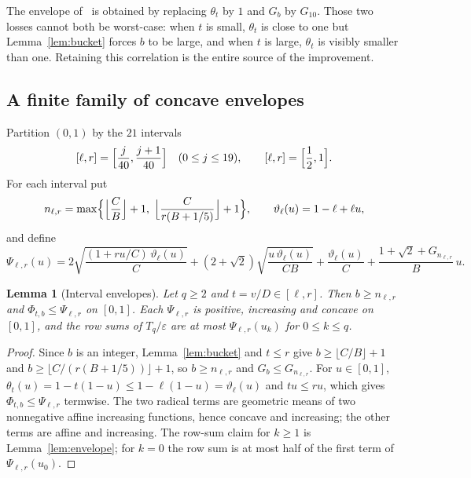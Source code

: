 \documentclass[11pt,a4paper]{article}
\newtheorem{lemma}[theorem]{Lemma}
\theoremstyle{definition}
\theoremstyle{remark}
\newcommand{\eps}{\varepsilon}
\newcommand{\1}{\mathbf 1}
\begin{document}
The envelope of~\cite{SS} is obtained by replacing $\theta_t$ by $1$ and
$G_b$ by $G_{10}$. Those two losses cannot both be worst-case: when $t$
is small, $\theta_t$ is close to one but Lemma~\ref{lem:bucket} forces
$b$ to be large, and when $t$ is large, $\theta_t$ is visibly smaller
than one. Retaining this correlation is the entire source of the
improvement.

\subsection{A finite family of concave envelopes}\label{sec:intervals}
Partition $(0,1)$ by the $21$ intervals
\[
 [\ell,r]=\Bigl[\frac j{40},\frac{j+1}{40}\Bigr]\quad(0\le j\le19),
 \qquad[\ell,r]=\Bigl[\frac12,1\Bigr].
\]
For each interval put
\begin{equation}\label{eq:nlr}
 n_{\ell,r}=\max\Bigl\{\Bigl\lfloor\frac CB\Bigr\rfloor+1,\;
 \Bigl\lfloor\frac C{r(B+1/5)}\Bigr\rfloor+1\Bigr\},
 \qquad\vartheta_\ell(u)=1-\ell+\ell u,
\end{equation}
and define
\begin{equation}\label{eq:Psi}
 \Psi_{\ell,r}(u)=2\sqrt{\frac{(1+ru/C)\,\vartheta_\ell(u)}C}
 +(2+\sqrt2)\sqrt{\frac{u\,\vartheta_\ell(u)}{CB}}
 +\frac{\vartheta_\ell(u)}C+\frac{1+\sqrt2+G_{n_{\ell,r}}}{B}\,u .
\end{equation}

\begin{lemma}[Interval envelopes]\label{lem:interval}
Let $q\ge2$ and $t=v/D\in[\ell,r]$. Then $b\ge n_{\ell,r}$ and
$\Phi_{t,b}\le\Psi_{\ell,r}$ on $[0,1]$. Each $\Psi_{\ell,r}$ is positive,
increasing and concave on $[0,1]$, and the row sums of $T_q/\eps$ are at
most $\Psi_{\ell,r}(u_k)$ for $0\le k\le q$.
\end{lemma}
\begin{proof}
Since $b$ is an integer, Lemma~\ref{lem:bucket} and $t\le r$ give
$b\ge\lfloor C/B\rfloor+1$ and $b\ge\lfloor C/(r(B+1/5))\rfloor+1$, so
$b\ge n_{\ell,r}$ and $G_b\le G_{n_{\ell,r}}$. For $u\in[0,1]$,
$\theta_t(u)=1-t(1-u)\le1-\ell(1-u)=\vartheta_\ell(u)$ and
$tu\le ru$, which gives $\Phi_{t,b}\le\Psi_{\ell,r}$ termwise. The two
radical terms are geometric means of two nonnegative affine increasing
functions, hence concave and increasing; the other terms are affine and
increasing. The row-sum claim for $k\ge1$ is Lemma~\ref{lem:envelope};
for $k=0$ the row sum is at most half of the first term of
$\Psi_{\ell,r}(u_0)$.
\end{proof}
\end{document}
